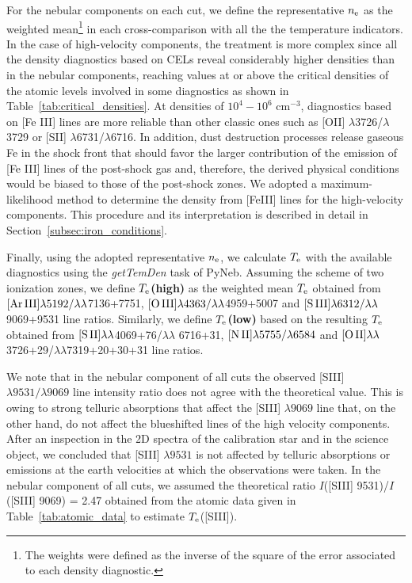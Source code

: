 \documentclass[fleqn,usenatbib]{mnras}
\begin{document}
For the nebular components on each cut, we define the representative $n_{\rm e}$ as the weighted mean\footnote{The weights were defined as the inverse of the square of the error associated to each density diagnostic.} in each cross-comparison with all the the temperature indicators. In the case of high-velocity components, the treatment is more complex since all the density diagnostics based on CELs reveal considerably higher densities than in the nebular components, reaching values at or above the critical densities of the atomic levels involved in some diagnostics as shown in Table~\ref{tab:critical_densities}. At densities of $10^4-10^6 \text{ cm}^{-3}$, diagnostics based on [Fe \thinspace III] lines are more reliable than other classic ones such as [O\thinspace II] $\lambda$3726/$\lambda$3729 or [S\thinspace II] $\lambda$6731/$\lambda$6716. In addition, dust destruction processes release gaseous Fe in the shock front that should favor the larger contribution of the emission of [Fe \thinspace III] lines of the post-shock gas and, therefore, the derived physical conditions would be biased to those of the post-shock zones. We adopted a maximum-likelihood method to determine the density from [Fe\thinspace III] lines for the high-velocity components. This procedure and its interpretation is described in detail in Section~\ref{subsec:iron_conditions}.

Finally, using the adopted representative $n_{\rm e}$, we calculate $T_{\rm e}$ with the available diagnostics using the \textit{getTemDen} task of PyNeb. Assuming the scheme of two ionization zones, we define \textbf{\boldmath${T_{\rm e}}$(high) } as the weighted mean $T_{\rm e}$ obtained from  $\mbox{[Ar}\thinspace \mbox{III]} \lambda 5192/ \lambda \lambda$7136+7751, $\mbox{[O}\thinspace \mbox{III]} \lambda4363/\lambda \lambda$4959+5007 and $\mbox{[S}\thinspace \mbox{III]} \lambda6312/\lambda \lambda$9069+9531 line ratios. Similarly, we define \textbf{\boldmath${T_{\rm e}}$(low) } based on the resulting $T_{\rm e}$ obtained from $\mbox{[S}\thinspace \mbox{II]} \lambda \lambda$4069+76/$\lambda \lambda$ 6716+31, $\mbox{[N}\thinspace \mbox{II]}\lambda5755/\lambda6584$ and $\mbox{[O}\thinspace \mbox{II]} \lambda \lambda$3726+29/$\lambda \lambda$7319+20+30+31 line ratios.

We note that in the nebular component of all cuts the observed \mbox{[S}\thinspace \mbox{III]} $\lambda9531/\lambda9069$ line intensity ratio does not agree with the theoretical value. This is owing to strong telluric absorptions that affect the \mbox{[S}\thinspace \mbox{III]} $\lambda 9069$ line that, on the other hand, do not affect the blueshifted lines of the high velocity components. After an inspection in the 2D spectra of the calibration star and in the science object, we concluded that \mbox{[S}\thinspace \mbox{III]} $\lambda 9531$ is not affected by telluric absorptions or emissions at the earth velocities at which the observations were taken. In the nebular component of all cuts, we assumed the theoretical ratio $I$(\mbox{[S}\thinspace \mbox{III]} 9531)/$I$(\mbox{[S}\thinspace \mbox{III]} 9069) = 2.47 obtained from the atomic data given in Table~\ref{tab:atomic_data} to estimate $T_{\rm e}$(\mbox{[S}\thinspace \mbox{III]}).
\end{document}
